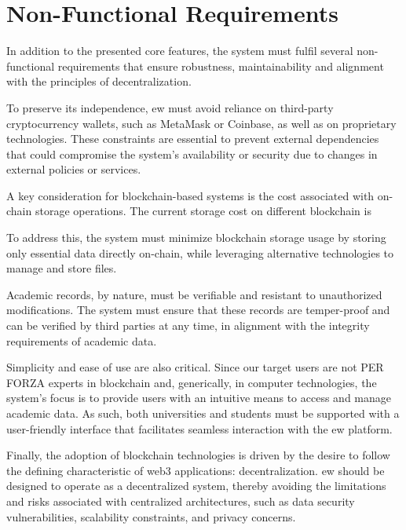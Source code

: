 \section{Non-Functional Requirements}
\label{sec:nonFunctionalRequirements}
In addition to the presented core features, the system must fulfil several non-functional requirements that ensure robustness, maintainability and alignment with the principles of decentralization. 

To preserve its independence, \acrshort{ew} must avoid reliance on third-party cryptocurrency wallets, such as MetaMask or Coinbase, as well as on proprietary technologies. These constraints are essential to prevent external dependencies that could compromise the system’s availability or security due to changes in external policies or services.

A key consideration for blockchain-based systems is the cost associated with on-chain storage operations. The current storage cost on different blockchain is %

To address this, the system must minimize blockchain storage usage by storing only essential data directly on-chain, while leveraging alternative technologies to manage and store files.

Academic records, by nature, must be verifiable and resistant to unauthorized modifications. The system must ensure that these records are temper-proof and can be verified by third parties at any time, in alignment with the integrity requirements of academic data.

Simplicity and ease of use are also critical. Since our target users are not PER FORZA experts in blockchain and, generically, in computer technologies, the system's focus is to provide users with an intuitive means to access and manage academic data. As such, both universities and students must be supported with a user-friendly interface that facilitates seamless interaction with the \acrshort{ew} platform.

Finally, the adoption of blockchain technologies is driven by the desire to follow the defining characteristic of \Gls{web3} applications: decentralization. \acrshort{ew} should be designed to operate as a decentralized system, thereby avoiding the limitations and risks associated with centralized architectures, such as data security vulnerabilities, scalability constraints, and privacy concerns. %

